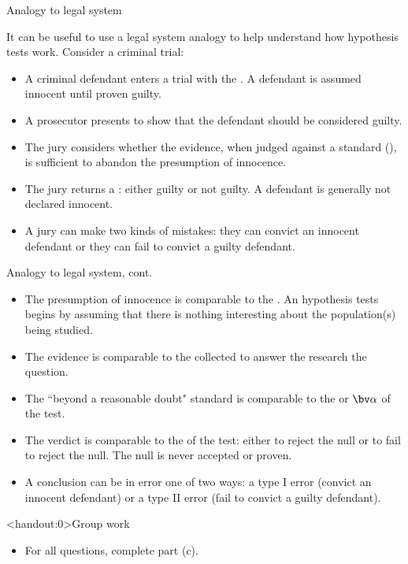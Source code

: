 \documentclass[xcolor=table, aspectratio=169, bigger]{beamer}
\begin{document}
\begin{frame}{Analogy to legal system}
\begin{block}{}
It can be useful to use a legal system analogy to help understand how hypothesis tests work. Consider a criminal trial:
\begin{itemize}
\pause\item A criminal defendant enters a trial with the . A defendant is assumed innocent until proven guilty.
\pause\item A prosecutor presents  to show that the defendant should be considered guilty.
\pause\item The jury considers whether the evidence, when judged against a standard (), is sufficient to abandon the presumption of innocence.
\pause\item The jury returns a : either guilty or not guilty. A defendant is generally not declared innocent.   
\pause\item A jury can make two kinds of mistakes: they can convict an innocent defendant or they can fail to convict a guilty defendant.
\end{itemize}
\end{block}
\end{frame}

\begin{frame}{Analogy to legal system, cont.}
\begin{block}{}
\begin{itemize}
\item The presumption of innocence is comparable to the . An hypothesis tests begins by assuming that there is nothing interesting about the population(s) being studied.
\pause\item The evidence is comparable to the  collected to answer the research the question.
\pause\item The ``beyond a reasonable doubt" standard is comparable to the  or $\bv \alpha$ of the test.
\pause\item The verdict is comparable to the  of the test: either to reject the null or to fail to reject the null. The null is never accepted or proven.
\pause\item A conclusion can be in error one of two ways: a type I error (convict an innocent defendant) or a type II error (fail to convict a guilty defendant).
\end{itemize}
\end{block}
\end{frame}

\begin{frame}<handout:0>{Group work}
\begin{block}{}
\large
\begin{itemize}
\item For all questions, complete part (c).
\end{itemize}
\end{block}
\end{frame}
\end{document}
